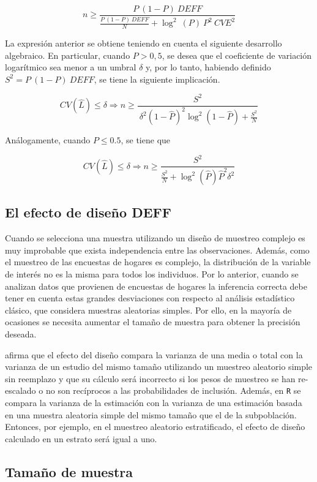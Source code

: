 \documentclass[
  12pt,
]{book}
\begin{document}
\[
n \geq \dfrac{P \ (1-P) \  DEFF}{\frac{P \  (1-P) \ DEFF}{N}+\log^2\ (P) \ P^2 \ CVE^2}
\]

La expresión anterior se obtiene teniendo en cuenta el siguiente desarrollo algebraico. En particular, cuando \(P > 0,5\), se desea que el coeficiente de variación logarítmico sea menor a un umbral \(\delta\) y, por lo tanto, habiendo definido \(S^2 = P\ (1-P) \  DEFF\), se tiene la siguiente implicación.

\[
CV(\hat{L}) \leq \delta 
\Longrightarrow
n \geq \frac{S^2}{\ \delta^2(1-\hat{P})^2\log^2(1-\hat{P}) +\frac{S^2}{N}}
\]

Análogamente, cuando \(P \leq 0.5\), se tiene que

\[
CV(\hat{L}) \leq \delta
\Longrightarrow
n \geq \dfrac{S^2}{\frac{S^2}{N}+\log^2(\hat{P})\hat{P}^2\delta^2}
\]

\hypertarget{el-efecto-de-diseuxf1o-deff}{%
\subsection{El efecto de diseño DEFF}\label{el-efecto-de-diseuxf1o-deff}}

Cuando se selecciona una muestra utilizando un diseño de muestreo complejo es muy improbable que exista independencia entre las observaciones. Además, como el muestreo de las encuestas de hogares es complejo, la distribución de la variable de interés no es la misma para todos los individuos. Por lo anterior, cuando se analizan datos que provienen de encuestas de hogares la inferencia correcta debe tener en cuenta estas grandes desviaciones con respecto al análisis estadístico clásico, que considera muestras aleatorias simples. Por ello, en la mayoría de ocasiones se necesita aumentar el tamaño de muestra para obtener la precisión deseada.

\citet{Lumley_2010} afirma que el efecto del diseño compara la varianza de una media o total con la varianza de un estudio del mismo tamaño utilizando un muestreo aleatorio simple sin reemplazo y que su cálculo será incorrecto si los pesos de muestreo se han re-escalado o no son recíprocos a las probabilidades de inclusión. Además, en \texttt{R} se compara la varianza de la estimación con la varianza de una estimación basada en una muestra aleatoria simple del mismo tamaño que el de la subpoblación. Entonces, por ejemplo, en el muestreo aleatorio estratificado, el efecto de diseño calculado en un estrato será igual a uno.

\hypertarget{tamauxf1o-de-muestra}{%
\subsection{Tamaño de muestra}\label{tamauxf1o-de-muestra}}
\end{document}
